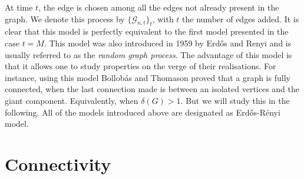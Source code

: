 At time $t$, the edge is chosen among all the edges not already present in the graph. We denote this process by $\{\mathcal{G}_{n, t}\}_t$, with $t$ the number of edges added. 
It is clear that this model is perfectly equivalent to the first model presented in the case $t = M$. 
This model was also introduced in 1959 by Erd\H{o}s and Renyi and is usually referred to as the \emph{random graph process}.
The advantage of this model is that it allows one to study properties on the verge of their realisations.
For instance, using this model Bollob\'as and Thomason \cite{Bollob85} proved that a graph is fully connected, when the last connection made is between an isolated vertices and the giant component. Equivalently, when $\delta(G) > 1$. But we will study this in the following.
\newline
All of the models introduced above are designated as Erd\H{o}s-R\'enyi model.



\section{Connectivity}

